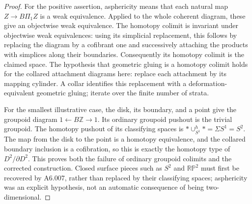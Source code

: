 \begin{proof}
For the positive assertion, asphericity means that each natural
map $Z\to B\Pi_1 Z$ is a weak equivalence. Applied to the whole
coherent diagram, these give an objectwise weak equivalence.
The homotopy colimit is invariant under objectwise weak
equivalences: using its simplicial replacement, this follows
by replacing the diagram by a cofibrant one and successively
attaching the products with simplices along their boundaries.
Consequently its homotopy colimit is the claimed space.
The hypothesis that geometric gluing is a homotopy colimit
holds for the collared attachment diagrams here: replace each
attachment by its mapping cylinder. A collar identifies this
replacement with a deformation-equivalent geometric gluing;
iterate over the finite number of strata.

For the smallest illustrative case, the disk, its boundary,
and a point give the groupoid diagram
$1\leftarrow B\mathbb Z\to1$.
Its ordinary groupoid pushout is the trivial groupoid. The
homotopy pushout of its classifying spaces is
$*\cup^h_{S^1}*=\Sigma S^1=S^2$.
The map from the disk to the point is a homotopy equivalence,
and the collared boundary inclusion is a cofibration, so this
is exactly the homotopy type of $D^2/\partial D^2$.
This proves both the failure of ordinary groupoid colimits
and the corrected construction. Closed surface pieces such
as $S^2$ and $\mathbb{RP}^2$ must first be recovered by
A6.007, rather than replaced by their classifying spaces;
asphericity was an explicit hypothesis, not an automatic
consequence of being two-dimensional.
\end{proof}


